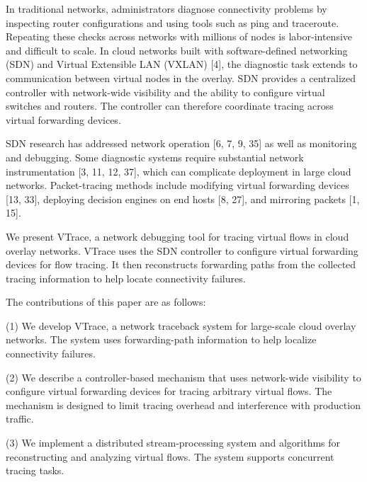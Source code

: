 \documentclass[11pt,a4paper]{article}
\begin{document}
In traditional networks, administrators diagnose connectivity problems by inspecting router configurations and using tools such as ping and traceroute. Repeating these checks across networks with millions of nodes is labor-intensive and difficult to scale. In cloud networks built with software-defined networking (SDN) and Virtual Extensible LAN (VXLAN) [4], the diagnostic task extends to communication between virtual nodes in the overlay. SDN provides a centralized controller with network-wide visibility and the ability to configure virtual switches and routers. The controller can therefore coordinate tracing across virtual forwarding devices.

SDN research has addressed network operation [6, 7, 9, 35] as well as monitoring and debugging. Some diagnostic systems require substantial network instrumentation [3, 11, 12, 37], which can complicate deployment in large cloud networks. Packet-tracing methods include modifying virtual forwarding devices [13, 33], deploying decision engines on end hosts [8, 27], and mirroring packets [1, 15].

We present VTrace, a network debugging tool for tracing virtual flows in cloud overlay networks. VTrace uses the SDN controller to configure virtual forwarding devices for flow tracing. It then reconstructs forwarding paths from the collected tracing information to help locate connectivity failures.

The contributions of this paper are as follows:

(1) We develop VTrace, a network traceback system for large-scale cloud overlay networks. The system uses forwarding-path information to help localize connectivity failures.

(2) We describe a controller-based mechanism that uses network-wide visibility to configure virtual forwarding devices for tracing arbitrary virtual flows. The mechanism is designed to limit tracing overhead and interference with production traffic.

(3) We implement a distributed stream-processing system and algorithms for reconstructing and analyzing virtual flows. The system supports concurrent tracing tasks.
\fi
\end{document}

